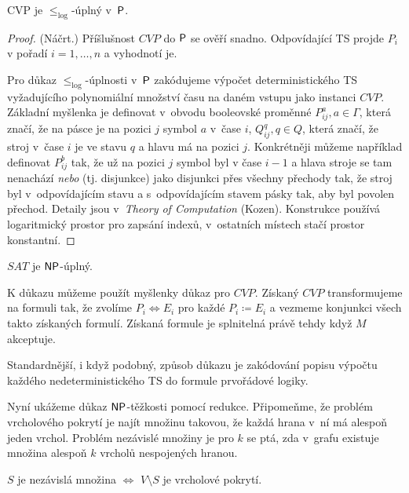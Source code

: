 \begin{theorem}
    CVP je $\leq_{\log}$-úplný v~$\P$.
\end{theorem}

\begin{proof} (Náčrt.)
    Příšlušnost $CVP$ do $\P$ se ověří snadno. Odpovídající TS projde
    $P_i$ v pořadí $i = 1,\ldots,n$ a vyhodnotí je.

    Pro důkaz $\leq_{\log}$-úplnosti v~$\P$ zakódujeme výpočet
    deterministického TS vyžadujícího polynomiální množství času na
    daném vstupu jako instanci $CVP$.
    Základní myšlenka je definovat v~obvodu booleovské proměnné
    $P^{a}_{ij}, a \in \Gamma$, která značí, že na pásce je na pozici
    $j$ symbol $a$ v~čase $i$,
    $Q^q_{ij}, q \in Q$, která značí, že stroj v~čase $i$ je ve stavu $q$
    a hlavu má na pozici $j$.
    Konkrétněji můžeme například definovat $P^{b}_{ij}$ tak,
    že už na pozici $j$ symbol byl v čase $i-1$ a hlava stroje se tam
    nenachází {\em nebo} (tj. disjunkce)
    jako disjunkci přes všechny přechody tak, že stroj byl
    v~odpovídajícím stavu a s~odpovídajícím stavem pásky tak, aby byl
    povolen přechod.
    Detaily jsou v~{\em Theory of Computation} (Kozen).
    Konstrukce používá logaritmický prostor pro zapsání indexů,
    v~ostatních místech stačí prostor konstantní.
\end{proof}

\pagebreak

\begin{theorem}
    $SAT$ je $\NP$-úplný.
\end{theorem}

K důkazu můžeme použít myšlenky důkaz pro $CVP$.
Získaný $CVP$ transformujeme na formuli tak, že zvolíme
$P_i \Leftrightarrow E_i$ pro každé $P_i \coloneqq E_i$
a vezmeme konjunkci všech takto získaných formulí. Získaná formule je
splnitelná právě tehdy když $M$ akceptuje.

Standardnější, i když podobný, způsob důkazu je zakódování popisu
výpočtu každého nedeterministického TS do formule prvořádové logiky.


Nyní ukážeme důkaz $\NP$-těžkosti pomocí redukce. Připomeňme, že problém
vrcholového pokrytí je najít množinu takovou, že každá hrana v~ní má
alespoň jeden vrchol. Problém nezávislé množiny je pro $k$ se ptá, zda
v~grafu existuje množina alespoň $k$ vrcholů nespojených hranou.

\begin{theorem}
    $S$ je nezávislá množina $\iff$ $V \setminus S$ je vrcholové
    pokrytí.
\end{theorem}

